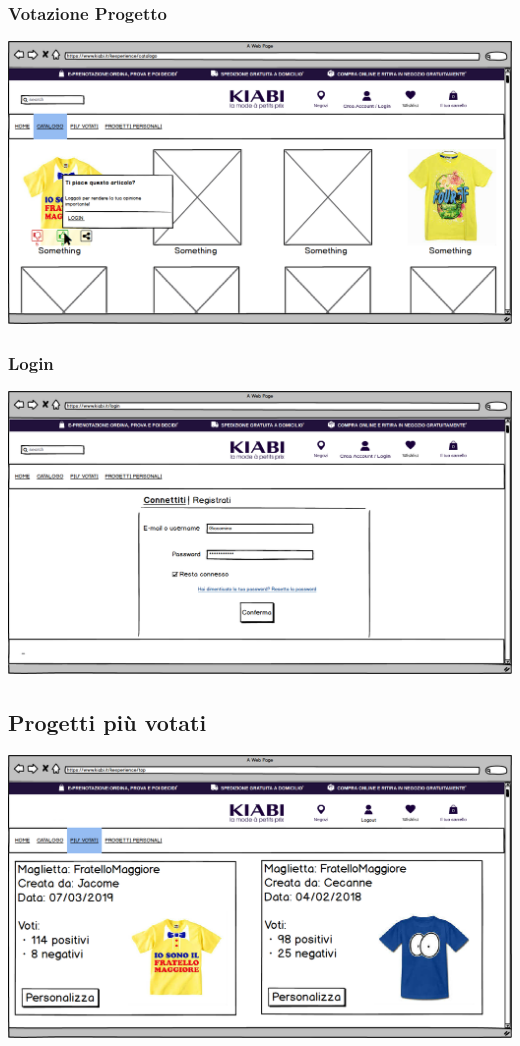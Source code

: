\documentclass[12pt,italian,]{report}
\begin{document}
\subsubsection{Votazione Progetto} 
\includegraphics{balsamiq/Catalogo login.png}
\subsubsection{Login} 
\includegraphics{balsamiq/Login.png}
\subsection{Progetti più votati} 
\includegraphics{balsamiq/Most Rated.png}
\end{document}
